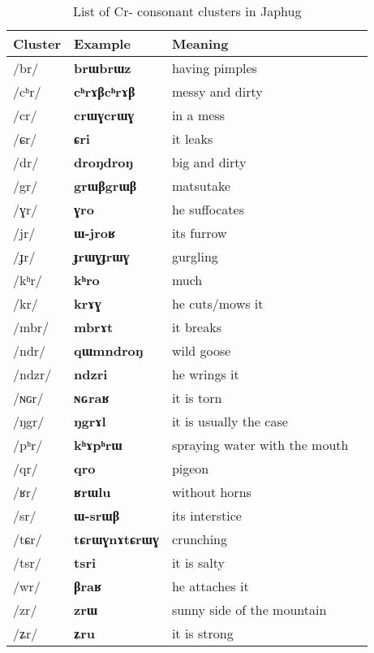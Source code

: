 \documentclass[oneside,a4paper,11pt]{article}
\newcommand{\ipa}[1]{{\phon\mbox{\textbf{#1}}}}
\newcommand{\deux}[1]{/#1/}
\newcommand{\idph}[1]{\cellcolor{gray}\textbf{#1}}
\begin{document}
\begin{table}[H]
\caption{List of Cr- consonant clusters in Japhug} \label{tab:Cr} \centering
\begin{tabular}{llll}
\toprule
Cluster &Example &Meaning \\
\midrule
   \deux{br} \idph{}  	&   \ipa{brɯbrɯz}   	&   having pimples \\
  \deux{cʰr}\idph{}   	&   \ipa{cʰrɤβcʰrɤβ}   	&   messy and dirty \\
  \deux{cr} \idph{}  	&   \ipa{crɯɣcrɯɣ}   	&   in a mess  \\
  \deux{ɕr}   	&   \ipa{ɕri}   	&   it leaks \\
  \deux{dr} \idph{}  	&   \ipa{droŋdroŋ}   	&   big and dirty \\
  \deux{gr}   	&   \ipa{grɯβgrɯβ}   	&  matsutake  \\
  \deux{ɣr}   	&   \ipa{ɣro}   	&   he suffocates \\
  \deux{jr}   	&   \ipa{ɯ-jroʁ}   	&  its furrow  \\
  \deux{ɟr} \idph{}  	&   \ipa{ɟrɯɣɟrɯɣ}   	&   gurgling \\
  \deux{kʰr}   	&   \ipa{kʰro}   	&  much  \\
  \deux{kr}   	&   \ipa{krɤɣ}   	&   he cuts/mows it \\
  \deux{mbr}   	&   \ipa{mbrɤt}   	&  it breaks  \\
  \deux{ndr}   	&   \ipa{qɯmndroŋ}   	&   wild goose \\
  \deux{ndzr}   	&   \ipa{ndzri}   	&   he wrings it \\
  \deux{ɴɢr}   	&   \ipa{ɴɢraʁ}   	&  it is torn  \\
  \deux{ŋgr}   	&   \ipa{ŋgrɤl}   	&  it is usually the case  \\
  \deux{pʰr}   	&   \ipa{kʰɤpʰrɯ}   	&   spraying water with the mouth \\
  \deux{qr}   	&   \ipa{qro}   	&   pigeon \\
  \deux{ʁr}   	&   \ipa{ʁrɯlu}   	&   without horns \\
  \deux{sr}   	&   \ipa{ɯ-srɯβ}   	&  its interstice  \\
  \deux{tɕr} \idph{}  	&   \ipa{tɕrɯɣnɤtɕrɯɣ}   	&   crunching \\
  \deux{tsr}   	&   \ipa{tsri}   	&   it is salty \\
  \deux{wr}   	&   \ipa{βraʁ}   	&  he attaches it  \\
  \deux{zr}   	&   \ipa{zrɯ}   	&  sunny side of the mountain  \\
  \deux{ʑr}   	&   \ipa{ʑru}   	&  it is strong  \\
  \bottomrule
  \end{tabular}  
\end{table}  
  
\end{document}
